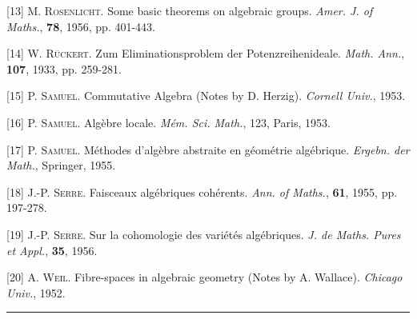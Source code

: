 [13] M. \textsc{Rosenlicht}. Some basic theorems on algebraic groups. \textit{Amer. J. of Maths.}, \textbf{78}, 1956, pp. 401-443.

[14] W. \textsc{Rückert}. Zum Eliminationsproblem der Potenzreihenideale. \textit{Math. Ann.}, \textbf{107}, 1933, pp. 259-281.

[15] P. \textsc{Samuel}. Commutative Algebra (Notes by D. Herzig). \textit{Cornell Univ.}, 1953.

[16] P. \textsc{Samuel}. Algèbre locale. \textit{Mém. Sci. Math.}, 123, Paris, 1953.



[17] P. \textsc{Samuel}. Méthodes d'algèbre abstraite en géométrie algébrique. \textit{Ergebn. der Math.}, Springer, 1955.

[18] J.-P. \textsc{Serre}. Faisceaux algébriques cohérents. \textit{Ann. of Maths.}, \textbf{61}, 1955, pp. 197-278.

[19] J.-P. \textsc{Serre}. Sur la cohomologie des variétés algébriques. \textit{J. de Maths. Pures et Appl.}, \textbf{35}, 1956.

[20] A. \textsc{Weil}. Fibre-spaces in algebraic geometry (Notes by A. Wallace). \textit{Chicago Univ.}, 1952.

\begin{center}\rule{4cm}{0.4pt}\end{center}
